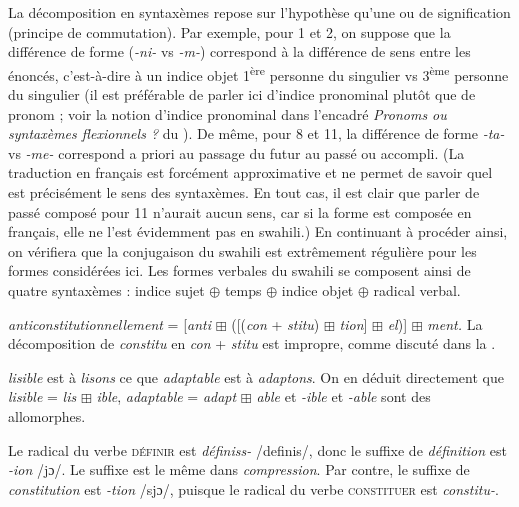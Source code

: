 {     La décomposition en syntaxèmes repose sur l’hypothèse qu’une  ou de signification (principe de commutation). Par exemple, pour 1 et 2, on suppose que la différence de forme (\textit{{}-ni-} vs \textit{{}-m-}) correspond à la différence de sens entre les énoncés, c’est-à-dire à un indice objet 1\textsuperscript{ère} personne du singulier vs 3\textsuperscript{ème} personne du singulier (il est préférable de parler ici d’indice pronominal plutôt que de pronom ; voir la notion d’indice pronominal dans l’encadré \textit{Pronoms ou syntaxèmes flexionnels ?} du ). De même, pour 8 et 11, la différence de forme \textit{{}-ta-} vs \textit{{}-me-} correspond a priori au passage du futur au passé ou accompli. (La traduction en français est forcément approximative et ne permet de savoir quel est précisément le sens des syntaxèmes. En tout cas, il est clair que parler de passé composé pour 11 n’aurait aucun sens, car si la forme est composée en français, elle ne l’est évidemment pas en swahili.) En continuant à procéder ainsi, on vérifiera que la conjugaison du swahili est extrêmement régulière pour les formes considérées ici. Les formes verbales du swahili se composent ainsi de quatre syntaxèmes : indice sujet \textrm{${\oplus}$} temps \textrm{${\oplus}$} indice objet \textrm{${\oplus}$} radical verbal.

     \textit{anticonstitutionnellement} = [\textit{anti} \textrm{${\boxplus}$} ([(\textit{con} + \textit{stitu}) \textrm{${\boxplus}$} \textit{tion}] \textrm{${\boxplus}$} \textit{el})] \textrm{${\boxplus}$} \textit{ment.} La décomposition de \textit{constitu} en \textit{con} + \textit{stitu} est impropre, comme discuté dans la .

     \textit{lisible} est à \textit{lisons} ce que \textit{adaptable} est à \textit{adaptons}. On en déduit directement que \textit{lisible} = \textit{lis} \textrm{${\boxplus}$} \textit{ible}, \textit{adaptable} = \textit{adapt} \textrm{${\boxplus}$} \textit{able} et \textit{{}-ible} et \textit{{}-able} sont des allomorphes.

     Le radical du verbe \textsc{définir} est \textit{définiss-} /definis/, donc le suffixe de \textit{définition} est \textit{{}-ion} /jɔ/. Le suffixe est le même dans \textit{compression}. Par contre, le suffixe de \textit{constitution} est \textit{{}-tion} /sjɔ/, puisque le radical du verbe \textsc{constituer} est \textit{constitu-}.

}
